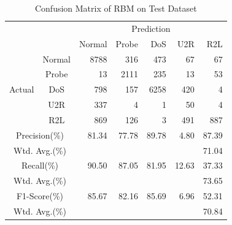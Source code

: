 \begin{table}[t]
    \caption{Confusion Matrix of RBM on Test Dataset}
    \centering
    \begin{tabular}{cc|rrrrr}
        \hline
        &  & \multicolumn{5}{c}{Prediction} \\
                        &        & Normal & Probe & DoS & U2R & R2L\\
        \hline
        \hline
        \multirow{5}{*}{Actual} & Normal & 8788 &  316 &  473 &  67 &   67 \\
                                & Probe  &   13 & 2111 &  235 &  13 &   53 \\
                                & DoS    &  798 &  157 & 6258 & 420 &    4 \\
                                & U2R    &  337 &    4 &    1 &  50 &    4 \\
                                & R2L    &  869 &  126 &    3 & 491 &  887 \\
        \hline
        \multicolumn{2}{c|}{Precision(\%)}   & 81.34& 77.78& 89.78& 4.80& 87.39\\
        \multicolumn{2}{c|}{Wtd. Avg.(\%)}   & \multicolumn{5}{r}{71.04}\\
        \hline
        \multicolumn{2}{c|}{Recall(\%)}      & 90.50& 87.05& 81.95& 12.63 &37.33\\
        \multicolumn{2}{c|}{Wtd. Avg.(\%)}   & \multicolumn{5}{r}{73.65}\\
        \hline
        \multicolumn{2}{c|}{F1-Score(\%)}    & 85.67& 82.16& 85.69 &6.96 &52.31\\
        \multicolumn{2}{c|}{Wtd. Avg.(\%)}   & \multicolumn{5}{r}{70.84}\\
        \hline

    \end{tabular}
\end{table}

